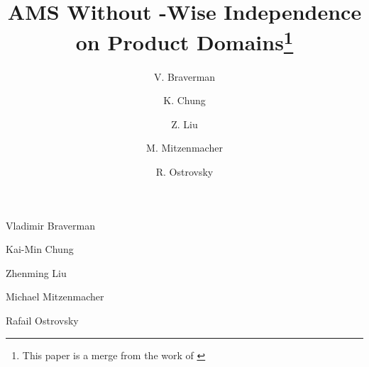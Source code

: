 \def\draft{0}  \documentclass[proceedings]{stacs}
\theoremstyle{plain}\newtheorem{satz}[thm]{Satz}
\theoremstyle{definition}\newtheorem{crucial}[thm]{Crucial Definition}
\begin{document}
\title[AMS Without -Wise Independence on Product Domains]{AMS Without -Wise Independence on Product Domains\footnote{This paper is a merge from the  work of \cite{BO01, BO02, CLM}}}

\author[lab1]{V. Braverman}{Vladimir Braverman}
\address[lab1]{University of California Los Angeles. Supported in part by NSF grants 0716835, 0716389, 0830803, 0916574
and Lockheed Martin Corporation.}      

\author[lab2]{K. Chung}{Kai-Min Chung}
\address[lab2]{Harvard School of Engineering and Applied Sciences. Supported by US-Israel BSF grant 2006060 and NSF grant CNS-0831289.}	    

\author[lab3]{Z. Liu}{Zhenming Liu}
\address[lab3]{Harvard School of Engineering and Applied Sciences. Supported in part by NSF grant CNS-0721491. The work was finished during an internship in Microsoft Research Asia.}
    

\author[lab4]{M. Mitzenmacher}{Michael Mitzenmacher}
\address[lab4]{Harvard School of Engineering and Applied Sciences. Supported in part by NSF grant CNS-0721491 and research grants from Yahoo!, Google, and Cisco.}
    

\author[lab5]{R. Ostrovsky}{Rafail Ostrovsky}
\address[lab5]{University of California Los Angeles. Supported in part by IBM Faculty Award, Lockheed-Martin Corporation
Research Award, Xerox Innovation Group Award, the Okawa Foundation Award,
Intel, Teradata, NSF grants 0716835, 0716389, 0830803, 0916574 and U.C.
MICRO grant.}      



\end{document}
